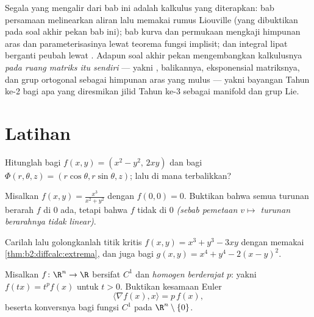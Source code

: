 \begin{remark}
Segala yang mengalir dari bab ini adalah kalkulus 
yang diterapkan: bab persamaan  melinearkan aliran lalu
memakai rumus  Liouville (yang dibuktikan pada soal akhir pekan
bab ini); bab kurva dan permukaan mengkaji
himpunan aras dan parameterisasinya lewat teorema fungsi
implisit; dan integral lipat berganti peubah lewat .
Adapun soal akhir pekan mengembangkan kalkulusnya \emph{pada ruang
matriks itu sendiri} --- yakni  , balikannya,
eksponensial matriksnya, dan grup ortogonal sebagai himpunan aras yang
mulus --- yakni bayangan Tahun ke-2 bagi apa yang diresmikan jilid
Tahun ke-3 sebagai manifold dan grup Lie.
\end{remark}

\section{Latihan}

\begin{exercise}[$\star$]\label{exo:b2:diffcalc:1}
Hitunglah  bagi $f(x,y) = (x^2 - y^2,\, 2xy)$ dan
bagi $\Phi(r,\theta,z) = (r\cos\theta, r\sin\theta, z)$; lalu di mana
 terbalikkan?
\end{exercise}

\begin{exercise}[$\star$]\label{exo:b2:diffcalc:2}
Misalkan $f(x,y) = \frac{x^3}{x^2 + y^2}$ dengan $f(0,0) = 0$. Buktikan bahwa semua
turunan berarah $f$ di $0$ ada, tetapi bahwa $f$ tidak
 di $0$ \emph{(sebab pemetaan $v \mapsto$ turunan
berarahnya tidak linear)}.
\end{exercise}

\begin{exercise}[$\star$]\label{exo:b2:diffcalc:3}
Carilah lalu golongkanlah titik kritis $f(x, y) = x^3 + y^3 -
3xy$ dengan memakai \cref{thm:b2:diffcalc:extrema}, dan juga bagi $g(x,y) = x^4 +
y^4 - 2(x - y)^2$.
\end{exercise}

\begin{exercise}[$\star\star$]\label{exo:b2:diffcalc:4}
Misalkan $f \colon \R^n \to \R$ bersifat $C^1$ dan \emph{homogen berderajat
$p$}: yakni $f(tx) = t^pf(x)$ untuk $t > 0$. Buktikan kesamaan Euler
\[
\langle \nabla f(x), x\rangle = p\,f(x) ,
\]
beserta konversnya bagi fungsi $C^1$ pada $\R^n\setminus\{0\}$.
\end{exercise}

